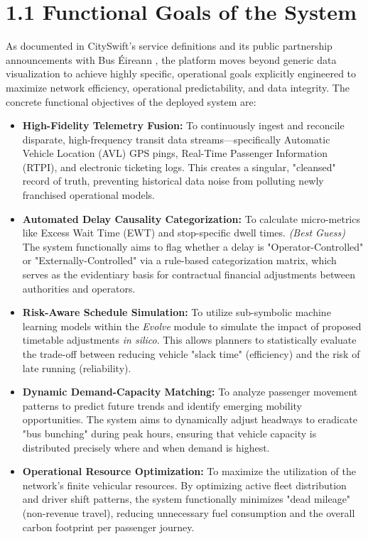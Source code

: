 \documentclass[]
{UCD_CS_41820_Report}
\begin{document}
\section*{1.1 Functional Goals of the System}
As documented in CitySwift's service definitions and its public partnership announcements with Bus Éireann \cite{cityswift_bus_eireann, cityswift_gov_uk}, the platform moves beyond generic data visualization to achieve highly specific, operational goals explicitly engineered to maximize network efficiency, operational predictability, and data integrity. The concrete functional objectives of the deployed system are:

\begin{itemize}
  \item \textbf{High-Fidelity Telemetry Fusion:} To continuously ingest and reconcile disparate, high-frequency transit data streams—specifically Automatic Vehicle Location (AVL) GPS pings, Real-Time Passenger Information (RTPI), and electronic ticketing logs. This creates a singular, "cleansed" record of truth, preventing historical data noise from polluting newly franchised operational models.

  \item \textbf{Automated Delay Causality Categorization:} To calculate micro-metrics like Excess Wait Time (EWT) and stop-specific dwell times. \textit{(Best Guess)} The system functionally aims to flag whether a delay is "Operator-Controlled" or "Externally-Controlled" via a rule-based categorization matrix, which serves as the evidentiary basis for contractual financial adjustments between authorities and operators.

  \item \textbf{Risk-Aware Schedule Simulation:} To utilize sub-symbolic machine learning models within the \textit{Evolve} module to simulate the impact of proposed timetable adjustments \textit{in silico}. This allows planners to statistically evaluate the trade-off between reducing vehicle "slack time" (efficiency) and the risk of late running (reliability).

  \item \textbf{Dynamic Demand-Capacity Matching:} To analyze passenger movement patterns to predict future trends and identify emerging mobility opportunities. The system aims to dynamically adjust headways to eradicate "bus bunching" during peak hours, ensuring that vehicle capacity is distributed precisely where and when demand is highest.

  \item \textbf{Operational Resource Optimization:} To maximize the utilization of the network’s finite vehicular resources. By optimizing active fleet distribution and driver shift patterns, the system functionally minimizes "dead mileage" (non-revenue travel), reducing unnecessary fuel consumption and the overall carbon footprint per passenger journey.


\end{itemize}
\end{document}
